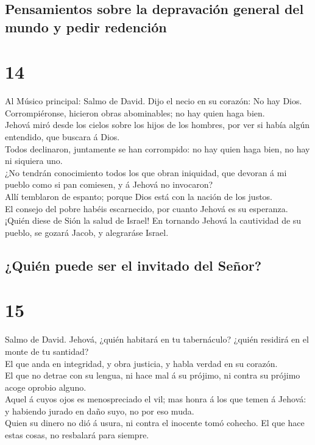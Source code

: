 \hypertarget{pensamientos-sobre-la-depravaciuxf3n-general-del-mundo-y-pedir-redenciuxf3n}{%
\subsection{Pensamientos sobre la depravación general del mundo y pedir
redención}\label{pensamientos-sobre-la-depravaciuxf3n-general-del-mundo-y-pedir-redenciuxf3n}}

\hypertarget{section-19-14}{%
\section{14}\label{section-19-14}}

 Al Músico principal: Salmo de David. Dijo el necio en su
corazón: No hay Dios. Corrompiéronse, hicieron obras abominables; no hay
quien haga bien.\\
 Jehová miró desde los cielos sobre los hijos de los
hombres, por ver si había algún entendido, que buscara á Dios.\\
 Todos declinaron, juntamente se han corrompido: no hay
quien haga bien, no hay ni siquiera uno.\\
 ¿No tendrán conocimiento todos los que obran iniquidad,
que devoran á mi pueblo como si pan comiesen, y á Jehová no invocaron?\\
 Allí temblaron de espanto; porque Dios está con la nación
de los justos.\\
 El consejo del pobre habéis escarnecido, por cuanto
Jehová es su esperanza.\\
 ¡Quién diese de Sión la salud de Israel! En tornando
Jehová la cautividad de su pueblo, se gozará Jacob, y alegraráse Israel.

\hypertarget{quiuxe9n-puede-ser-el-invitado-del-seuxf1or}{%
\subsection{¿Quién puede ser el invitado del
Señor?}\label{quiuxe9n-puede-ser-el-invitado-del-seuxf1or}}

\hypertarget{section-19-15}{%
\section{15}\label{section-19-15}}

 Salmo de David. Jehová, ¿quién habitará en tu
tabernáculo? ¿quién residirá en el monte de tu santidad?\\
 El que anda en integridad, y obra justicia, y habla
verdad en su corazón.\\
 El que no detrae con su lengua, ni hace mal á su prójimo,
ni contra su prójimo acoge oprobio alguno.\\
 Aquel á cuyos ojos es menospreciado el vil; mas honra á
los que temen á Jehová: y habiendo jurado en daño suyo, no por eso
muda.\\
 Quien su dinero no dió á usura, ni contra el inocente
tomó cohecho. El que hace estas cosas, no resbalará para siempre.

